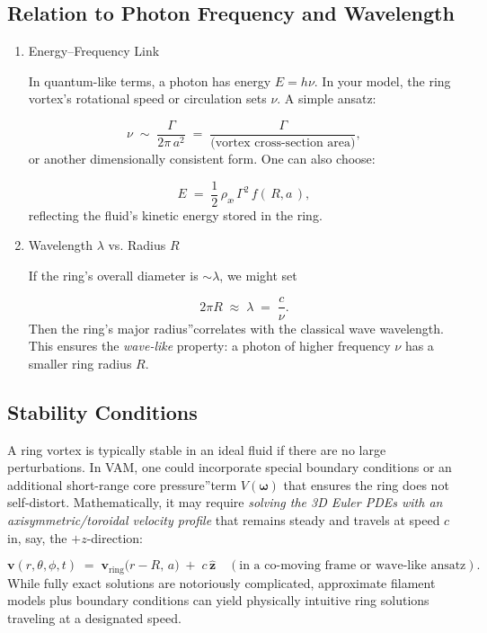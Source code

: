 \subsection{Relation to Photon Frequency and Wavelength}

\begin{enumerate}

    \item
    Energy–Frequency Link

    In quantum-like terms, a photon has energy $E=h\nu$. In your model, the ring vortex's rotational speed or circulation sets $\nu$. A simple ansatz:

    $$ \nu \;\sim\; \frac{\Gamma}{2\pi\,a^2} \;=\; \frac{\Gamma}{\text{(vortex cross-section area)}}, $$
    or another dimensionally consistent form. One can also choose:

    $$ E \;=\; \frac{1}{2}\,\rho_{\scriptscriptstyle \text{\ae}}\,\Gamma^2\,f(\,R,a\,), $$
    reflecting the fluid's kinetic energy stored in the ring.

    \item
    Wavelength $\lambda$ vs. Radius $R$

    If the ring's overall diameter is $\sim \lambda$, we might set

    $$ 2\pi R \;\approx\; \lambda \;=\; \frac{c}{\nu}. $$
    Then the ring's \grqq major radius\textquotedblright correlates with the classical wave wavelength. This ensures the \textit{wave-like} property: a photon of higher frequency $\nu$ has a smaller ring radius $R$.

\end{enumerate}

\subsection{Stability Conditions}

A ring vortex is typically stable in an ideal fluid if there are no large perturbations. In VAM, one could incorporate special boundary conditions or an additional short-range \grqq core pressure\textquotedblright term $V(\boldsymbol{\omega})$ that ensures the ring does not self-distort. Mathematically, it may require \textit{solving the 3D Euler PDEs with an axisymmetric/toroidal velocity profile} that remains steady and travels at speed $c$ in, say, the $+z$-direction:

$$
\mathbf{v}(r,\theta,\phi, t)
\;=\;
\mathbf{v}_\text{ring}\bigl(r - R,\,a\bigr)
\;+\;
c\,\hat{\mathbf{z}}
\quad
(\text{in a co-moving frame or wave-like ansatz}).
$$
While fully exact solutions are notoriously complicated, approximate filament models plus boundary conditions can yield physically intuitive ring solutions traveling at a designated speed.


